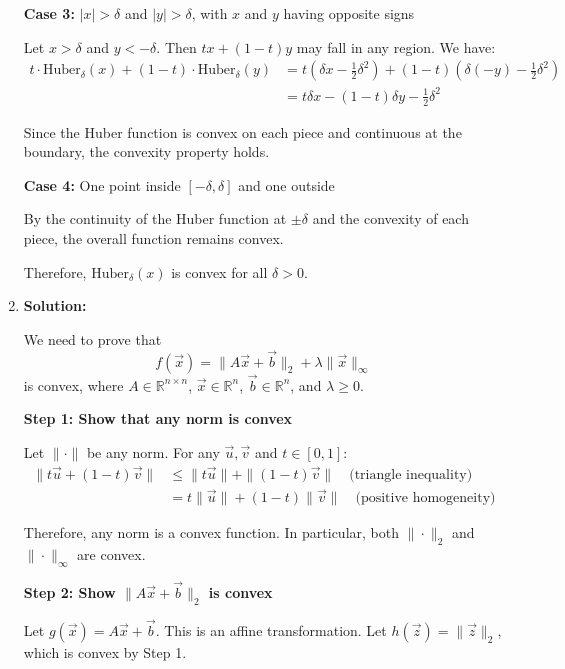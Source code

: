 \begin{enumerate}
    \textbf{Case 3:} $|x| > \delta$ and $|y| > \delta$, with $x$ and $y$ having opposite signs
    
    Let $x > \delta$ and $y < -\delta$. Then $tx + (1-t)y$ may fall in any region. We have:
    \begin{align*}
    t\cdot\text{Huber}_\delta(x) + (1-t)\cdot\text{Huber}_\delta(y) &= t(\delta x - \frac{1}{2}\delta^2) + (1-t)(\delta(-y) - \frac{1}{2}\delta^2) \\
    &= t\delta x - (1-t)\delta y - \frac{1}{2}\delta^2
    \end{align*}
    
    Since the Huber function is convex on each piece and continuous at the boundary, the convexity property holds.
    
    \textbf{Case 4:} One point inside $[-\delta, \delta]$ and one outside
    
    By the continuity of the Huber function at $\pm\delta$ and the convexity of each piece, the overall function remains convex.
    
    Therefore, $\text{Huber}_\delta(x)$ is convex for all $\delta > 0$.
    
    \item \textbf{Solution:}
    
    We need to prove that 
    \[
    f(\vec{x}) = \|A\vec{x} + \vec{b}\|_2 + \lambda\|\vec{x}\|_\infty
    \]
    is convex, where $A \in \mathbb{R}^{n \times n}$, $\vec{x} \in \mathbb{R}^n$, $\vec{b} \in \mathbb{R}^n$, and $\lambda \geq 0$.
    
    \textbf{Step 1: Show that any norm is convex}
    
    Let $\|\cdot\|$ be any norm. For any $\vec{u}, \vec{v}$ and $t \in [0,1]$:
    \begin{align*}
    \|t\vec{u} + (1-t)\vec{v}\| &\leq \|t\vec{u}\| + \|(1-t)\vec{v}\| \quad \text{(triangle inequality)}\\
    &= t\|\vec{u}\| + (1-t)\|\vec{v}\| \quad \text{(positive homogeneity)}
    \end{align*}
    
    Therefore, any norm is a convex function. In particular, both $\|\cdot\|_2$ and $\|\cdot\|_\infty$ are convex.
    
    \textbf{Step 2: Show $\|A\vec{x} + \vec{b}\|_2$ is convex}
    
    Let $g(\vec{x}) = A\vec{x} + \vec{b}$. This is an affine transformation. Let $h(\vec{z}) = \|\vec{z}\|_2$, which is convex by Step 1.
    

\end{enumerate}
